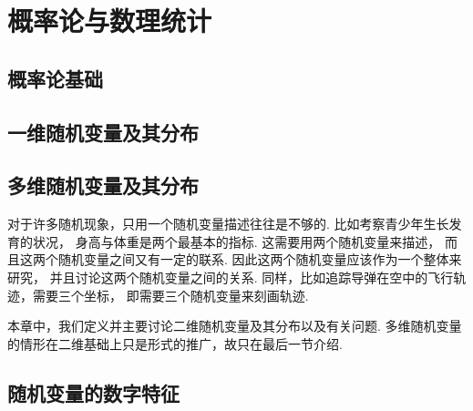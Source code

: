 \part{概率论与数理统计}
\begingroup
\def\x{\chi^2}%
\def\dotsim{\overset{.}{\sim}}%

\chapter{概率论基础}






\chapter{一维随机变量及其分布}





\chapter{多维随机变量及其分布}
对于许多随机现象，只用一个随机变量描述往往是不够的.
比如考察青少年生长发育的状况，
身高与体重是两个最基本的指标.
这需要用两个随机变量来描述，
而且这两个随机变量之间又有一定的联系.
因此这两个随机变量应该作为一个整体来研究，
并且讨论这两个随机变量之间的关系.
同样，比如追踪导弹在空中的飞行轨迹，需要三个坐标，
即需要三个随机变量来刻画轨迹.

本章中，我们定义并主要讨论二维随机变量及其分布以及有关问题.
多维随机变量的情形在二维基础上只是形式的推广，故只在最后一节介绍.










\chapter{随机变量的数字特征}











